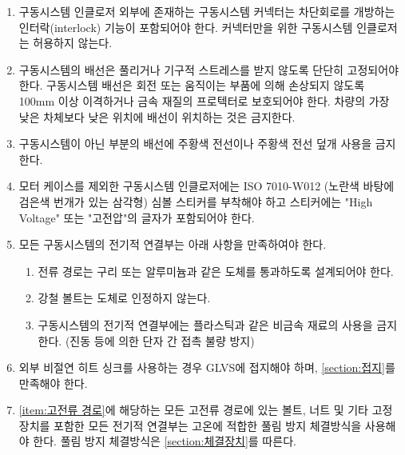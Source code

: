 \documentclass[final,a4paper,10pt]{report}
\begin{document}
\begin{enumerate}
  \item\label{rule:formula-technical.tractive-system-wiring.external-connector-interlock} {\color{blue}구동시스템} 인클로저 외부에 존재하는 구동시스템 커넥터는 차단회로를 개방하는 인터락(interlock) 기능이 포함되어야 한다. 커넥터만을 위한 {\color{blue}구동시스템} 인클로저는 허용하지 않는다.
  \item\label{rule:formula-technical.tractive-system-wiring.secure-fixed-100mm-clearance} 구동시스템의 배선은 풀리거나 기구적 스트레스를 받지 않도록 단단히 고정되어야 한다. 구동시스템 배선은 회전 또는 움직이는 부품에 의해 손상되지 않도록 100mm 이상 이격하거나 금속 재질의 프로텍터로 보호되어야 한다. 차량의 가장 낮은 차체보다 낮은 위치에 배선이 위치하는 것은 금지한다.
  \item\label{rule:formula-technical.tractive-system-wiring.orange-reserved-for-ts} 구동시스템이 아닌 부분의 배선에 주황색 전선이나 주황색 전선 덮개 사용을 금지한다.
  \item\label{rule:formula-technical.tractive-system-wiring.high-voltage-warning-sticker} 모터 케이스를 제외한 {\color{blue}구동시스템} 인클로저에는 ISO 7010-W012 (노란색 바탕에 검은색 번개가 있는 삼각형) 심볼 스티커를 부착해야 하고 스티커에는 "High Voltage" 또는 "고전압"의 글자가 포함되어야 한다.

  \item\label{rule:formula-technical.tractive-system-wiring.connection-material} 모든 구동시스템의 전기적 연결부는 아래 사항을 만족하여야 한다.
    \begin{enumerate}
      \item\label{rule:formula-technical.tractive-system-wiring.connection-material.copper-or-aluminum-path} 전류 경로는 구리 또는 알루미늄과 같은 도체를 통과하도록 설계되어야 한다.
      \item\label{rule:formula-technical.tractive-system-wiring.connection-material.steel-bolts-not-conductive} 강철 볼트는 도체로 인정하지 않는다.
      \item\label{rule:formula-technical.tractive-system-wiring.connection-material.no-plastic-connectors} 구동시스템의 전기적 연결부에는 플라스틱과 같은 비금속 재료의 사용을 금지한다. (진동 등에 의한 단자 간 접촉 불량 방지)
    \end{enumerate}

  \item\label{rule:formula-technical.tractive-system-wiring.uninsulated-heatsink-grounding} 외부 비절연 히트 싱크를 사용하는 경우 GLVS에 접지해야 하며, \ref{section:접지}를 만족해야 한다.
  \item\label{rule:formula-technical.tractive-system-wiring.anti-loosening-fasteners} \ref{item:고전류 경로}에 해당하는 모든 고전류 경로에 있는 볼트, 너트 및 기타 고정 장치를 포함한 모든 전기적 연결부는 고온에 적합한 풀림 방지 체결방식을 사용해야 한다. 풀림 방지 체결방식은 \ref{section:체결장치}를 따른다.


\end{enumerate}
\end{document}
